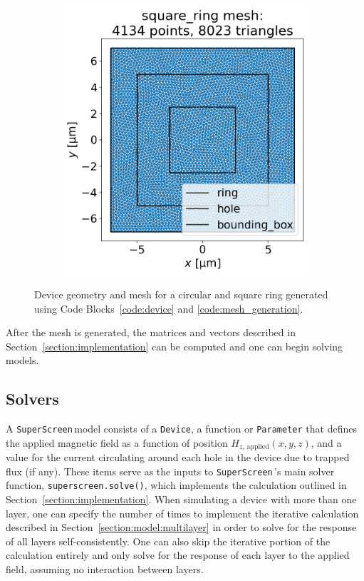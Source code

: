 \documentclass[preprint,12pt]{elsarticle}
\newcommand{\SuperScreen}{\texttt{SuperScreen}\,}
\begin{document}
\begin{figure}
\begin{subfigure}{.45\textwidth}
  \includegraphics[width=\linewidth]{examples/images/ring/square_ring_mesh.png}
  \label{fig:square_ring_mesh}
\end{subfigure}
\caption{Device geometry and mesh for a circular and square ring generated using Code Blocks~\ref{code:device} and \ref{code:mesh_generation}.}
\label{fig:ring_mesh}
\end{figure}
After the mesh is generated, the matrices and vectors described in Section~\ref{section:implementation} can be computed and one can begin solving models.

\subsection{Solvers}
\label{section:overview:solvers}

A \SuperScreen model consists of a \texttt{Device}, a function or \texttt{Parameter} that defines the applied magnetic field as a function of position $H_{z,\,\mathrm{applied}}(x, y, z)$, and a value for the current circulating around each hole in the device due to trapped flux (if any). These items serve as the inputs to \SuperScreen's main solver function, \texttt{superscreen.solve()}, which implements the calculation outlined in Section~\ref{section:implementation}. When simulating a device with more than one layer, one can specify the number of times to implement the iterative calculation described in Section~\ref{section:model:multilayer} in order to solve for the response of all layers self-consistently. One can also skip the iterative portion of the calculation entirely and only solve for the response of each layer to the applied field, assuming no interaction between layers.
\end{document}
